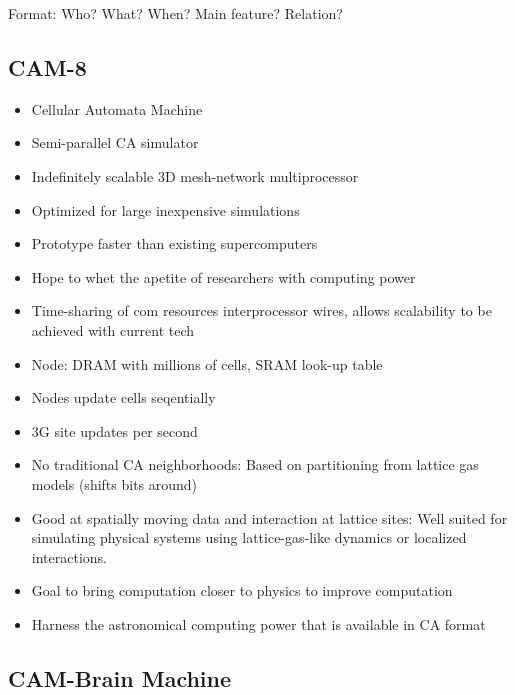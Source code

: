 \TODO

Format: Who? What? When? Main feature? Relation?

\subsection{CAM-8}

\begin{itemize}
    \item Cellular Automata Machine
    \item Semi-parallel CA simulator
    \item Indefinitely scalable 3D mesh-network multiprocessor
    \item Optimized for large inexpensive simulations
    \item Prototype faster than existing supercomputers
    \item Hope to whet the apetite of researchers with computing power
    \item Time-sharing of com resources interprocessor wires, allows scalability to be achieved with current tech
    \item Node: DRAM with millions of cells, SRAM look-up table
    \item Nodes update cells seqentially
    \item 3G site updates per second
    \item No traditional CA neighborhoods: Based on partitioning from lattice gas models (shifts bits around)
    \item Good at spatially moving data and interaction at lattice sites: Well suited for simulating physical systems using lattice-gas-like dynamics or localized interactions.
    \item Goal to bring computation closer to physics to improve computation
    \item Harness the astronomical computing power that is available in CA format
\end{itemize}

\subsection{CAM-Brain Machine}

